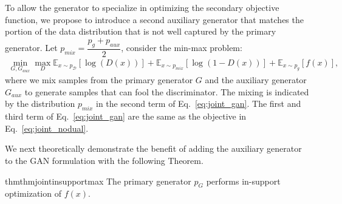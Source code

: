 To allow the generator to specialize in optimizing the secondary objective function, we propose to introduce a second auxiliary generator that matches the portion of the data distribution that is not well captured by the primary generator. Let $p_{mix} = \dfrac{ p_g + p_{aux} }{ 2 }$, consider the min-max problem:
\begin{align}
    \min_{G, G_{aux} } \max_{D}  \mathbb{E}_{ x \sim p_{\mathcal{D}} } [\log(D(x))] + \mathbb{E}_{ x \sim p_{mix} } [ \log(1-D(x))]  + \mathbb{E}_{ x \sim p_g } [ f ( x ) ], \label{eq:joint_gan}
\end{align}
where we mix samples from the primary generator $G$ and the auxiliary generator $G_{aux}$ to generate samples that can fool the discriminator. The mixing is indicated by the distribution $p_{mix}$ in the second term of Eq.~\ref{eq:joint_gan}. The first and third term of Eq.~\ref{eq:joint_gan} are the same as the objective in Eq.~\ref{eq:joint_nodual}.

We next theoretically demonstrate the benefit of adding the auxiliary generator to the GAN formulation with the following Theorem.

\begin{restatable}[Informal]{thm}{thmjointinsupportmax}
\label{thm_joint_in_support_max}
The primary generator $p_G$ performs in-support optimization of $f(x)$.
\end{restatable}


